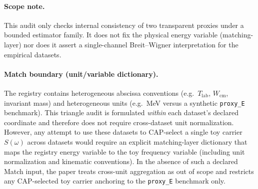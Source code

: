 \paragraph{Scope note.}
\AuditTag This audit only checks internal consistency of two transparent proxies under a bounded estimator family.
It does not fix the physical energy variable (matching-layer) nor does it assert a single-channel Breit--Wigner interpretation for the empirical datasets.

\paragraph{Match boundary (unit/variable dictionary).}
\AuditTag The registry contains heterogeneous abscissa conventions (e.g.\ $T_{\mathrm{lab}}$, $W_{\mathrm{cm}}$, invariant mass) and heterogeneous units (e.g.\ MeV versus a synthetic \texttt{proxy\_E} benchmark).
This triangle audit is formulated \emph{within} each dataset's declared coordinate and therefore does not require cross-dataset unit normalization.
However, any attempt to use these datasets to CAP-select a single toy carrier $S(\omega)$ across datasets would require an explicit matching-layer dictionary that maps the registry energy variable to the toy frequency variable (including unit normalization and kinematic conventions).
In the absence of such a declared Match input, the paper treats cross-unit aggregation as out of scope and restricts any CAP-selected toy carrier anchoring to the \texttt{proxy\_E} benchmark only.
